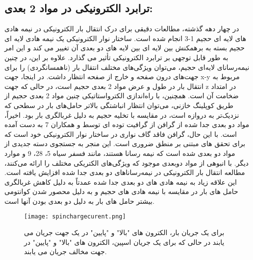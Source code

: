 \subsection{ترابرد الکترونیکی در مواد 2 بعدی:}
در چهار دهه گذشته، مطالعات دقیقی برای درک انتقال بار الکترونیکی در نیمه هادی های لایه ای حجیم 1-3 انجام شده است. ساختار نوار الکترونیکی یک نیمه هادی لایه ای حجیم بسته به برهمکنش بین لایه ای بین لایه های دو بعدی آن تغییر می کند و این امر به طور قابل توجهی بر ترابرد الکترونیکی تأثیر می گذارد. علاوه بر این، در چنین نیمه‌رسانای لایه‌ای حجیم، می‌توان ویژگی‌های مختلف انتقال بار (ناهمسانگردی) را برای جهت‌های درون صفحه  و خارج از صفحه  انتظار داشت. در اینجا، جهت x-y مربوط به انتقال بار در طول و عرض مواد 2 بعدی حجیم است، در حالی که جهت z در امتداد ضخامت آن است. همچنین، با راه‌اندازی الکترواستاتیکی چنین مواد 2 بعدی حجیم از طریق کوپلینگ خازنی، می‌توان انتظار انباشتگی بالاتر حامل‌های بار در سطحی که نزدیک‌تر به دروازه است، در مقایسه با تخلیه حجیم به دلیل غربالگری بار بود.
اخیراً، مواد دو بعدی جدا شده از گرافن از گرافیت توده ای توسط  و همکاران 7 به دست آمده است. با این حال، گرافن فاقد گاف نواری در ساختار نوار الکترونیکی خود است که برای تحقق  های مبتنی بر منطق ضروری است. این منجر به جستجوی دسته جدیدی از مواد دو بعدی شده است که نیمه رسانا هستند، مانند فسفر سیاه 5، 28، 9 و موارد دیگر. با انبوهی از مواد دوبعدی موجود که ویژگی‌های الکتریکی مختلف را ارائه می‌کنند، مطالعه انتقال بار الکترونیکی در نیمه‌رساناهای دو بعدی جدا شده افزایش یافته است. این علاقه زیاد به نیمه هادی های دو بعدی جدا شده عمدتاً به دلیل کاهش غربالگری حامل های بار در مقایسه با نیمه هادی های حجیم و به دلیل محصور شدن کوانتومی بیشتر حامل های بار به دلیل دو بعدی بودن آنها است.
\begin{figure*}[!ht]
    \centering
    \texttt{[image: spinchargecurent.png]}
    \caption{برای یک جریان بار، الکترون های "بالا" و "پایین" در یک جهت جریان می یابند در حالی که برای یک جریان اسپین، الکترون های "بالا" و "پایین" در جهت مخالف جریان می یابند.}
    \label{fig:spinchargecurent}
\end{figure*}

